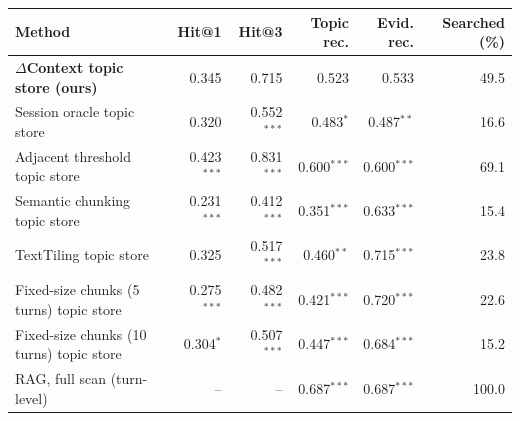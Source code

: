 \begin{tabular}{lrrrrr}
\toprule
Method & Hit@1 & Hit@3 & Topic rec. & Evid. rec. & Searched (\%) \\
\midrule
\textbf{$\Delta$Context topic store (ours)} & 0.345 & 0.715 & 0.523 & 0.533 & 49.5 \\
Session oracle topic store & 0.320 & 0.552$^{***}$ & 0.483$^{*}$ & 0.487$^{**}$ & 16.6 \\
Adjacent threshold topic store & 0.423$^{***}$ & 0.831$^{***}$ & 0.600$^{***}$ & 0.600$^{***}$ & 69.1 \\
Semantic chunking topic store & 0.231$^{***}$ & 0.412$^{***}$ & 0.351$^{***}$ & 0.633$^{***}$ & 15.4 \\
TextTiling topic store & 0.325 & 0.517$^{***}$ & 0.460$^{**}$ & 0.715$^{***}$ & 23.8 \\
Fixed-size chunks (5 turns) topic store & 0.275$^{***}$ & 0.482$^{***}$ & 0.421$^{***}$ & 0.720$^{***}$ & 22.6 \\
Fixed-size chunks (10 turns) topic store & 0.304$^{*}$ & 0.507$^{***}$ & 0.447$^{***}$ & 0.684$^{***}$ & 15.2 \\
RAG, full scan (turn-level) & -- & -- & 0.687$^{***}$ & 0.687$^{***}$ & 100.0 \\
\bottomrule
\end{tabular}
